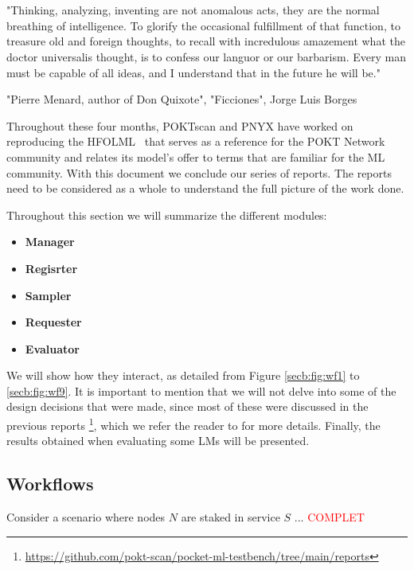 \section{}\label{sec:b}
\setlength{\epigraphwidth}{\textwidth}
\epigraph{\small "Thinking, analyzing, inventing are not anomalous acts, they are the normal breathing of intelligence. To glorify the occasional fulfillment of that function, to treasure old and foreign thoughts, to recall with incredulous amazement what the doctor universalis thought, is to confess our languor or our barbarism. Every man must be capable of all ideas, and I understand that in the future he will be."}{"Pierre Menard, author of Don Quixote", "Ficciones", Jorge Luis Borges}


Throughout these four months, POKTscan and PNYX have worked on reproducing the \gls{HFOLML}~\cite{noauthor_open_nodate} that serves as a reference for the POKT Network community and relates its model's offer to terms that are familiar for the \gls{ML} community. 
With this document we conclude our series of reports. The reports need to be considered as a whole to understand the full picture of the work done.

Throughout this section we will summarize the different modules:

\begin{itemize}[noitemsep]
    \item \textbf{Manager}
    \item \textbf{Regisrter}
    \item \textbf{Sampler}
    \item \textbf{Requester}
    \item \textbf{Evaluator}
\end{itemize}

We will show how they interact, as detailed from Figure \ref{secb:fig:wf1} to \ref{secb:fig:wf9}. 
It is important to mention that we will not delve into some of the design decisions that were made, since most of these were discussed in the previous reports \footnote{\url{https://github.com/pokt-scan/pocket-ml-testbench/tree/main/reports}}, which we refer the reader to for more details. 
Finally, the results obtained when evaluating some \glspl{LM} will be presented.  

\subsection{Workflows}

Consider a scenario where nodes $N$ are staked in service $S$ ... \textcolor{red}{COMPLET}

